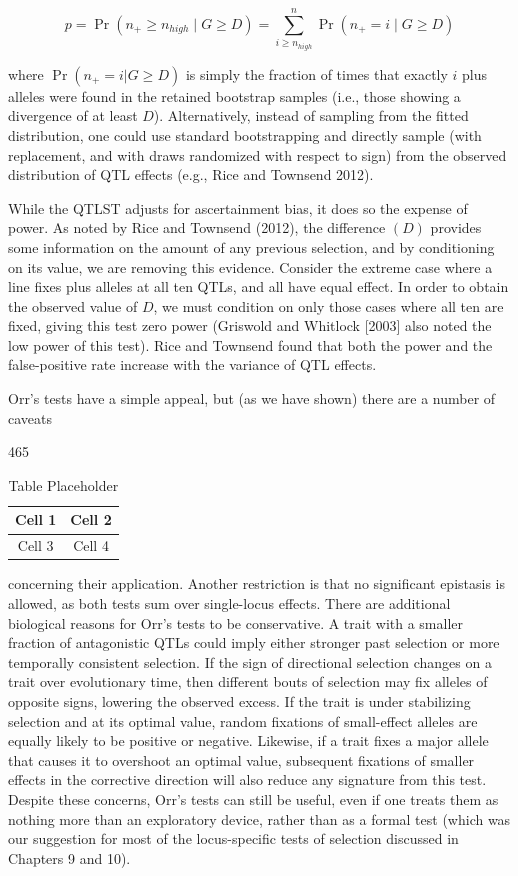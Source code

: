 \documentclass{article}
\begin{document}
\begin{equation}
p=\Pr(n_{+}\geq n_{high}\mid G\geq D)=\sum_{i\geq n_{high}}^{n}\Pr(n_{+}=i\mid G\geq D)
\tag{12.32}
\label{eq:12_32}
\end{equation}

where  $ \Pr(n_{+}=i|G\geq D) $ is simply the fraction of times that exactly  $ i $ plus alleles were found in the retained bootstrap samples (i.e., those showing a divergence of at least  $ D $). Alternatively, instead of sampling from the fitted distribution, one could use standard bootstrapping and directly sample (with replacement, and with draws randomized with respect to sign) from the observed distribution of QTL effects (e.g., Rice and Townsend 2012).

While the QTLST adjusts for ascertainment bias, it does so the expense of power. As noted by Rice and Townsend (2012), the difference  $ (D) $ provides some information on the amount of any previous selection, and by conditioning on its value, we are removing this evidence. Consider the extreme case where a line fixes plus alleles at all ten QTLs, and all have equal effect. In order to obtain the observed value of  $ D $, we must condition on only those cases where all ten are fixed, giving this test zero power (Griswold and Whitlock [2003] also noted the low power of this test). Rice and Townsend found that both the power and the false-positive rate increase with the variance of QTL effects.

Orr’s tests have a simple appeal, but (as we have shown) there are a number of caveats

465

\begin{table}[h]
\centering
\begin{tabular}{|c|c|}
\hline
Cell 1 & Cell 2 \\
\hline
Cell 3 & Cell 4 \\
\hline
\end{tabular}
\caption{Table Placeholder}
\end{table}

concerning their application. Another restriction is that no significant epistasis is allowed, as both tests sum over single-locus effects. There are additional biological reasons for Orr's tests to be conservative. A trait with a smaller fraction of antagonistic QTLs could imply either stronger past selection or more temporally consistent selection. If the sign of directional selection changes on a trait over evolutionary time, then different bouts of selection may fix alleles of opposite signs, lowering the observed excess. If the trait is under stabilizing selection and at its optimal value, random fixations of small-effect alleles are equally likely to be positive or negative. Likewise, if a trait fixes a major allele that causes it to overshoot an optimal value, subsequent fixations of smaller effects in the corrective direction will also reduce any signature from this test. Despite these concerns, Orr's tests can still be useful, even if one treats them as nothing more than an exploratory device, rather than as a formal test (which was our suggestion for most of the locus-specific tests of selection discussed in Chapters 9 and 10).
\end{document}
